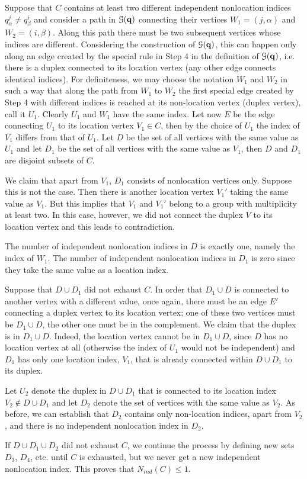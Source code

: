 \documentclass[draft]{article}
\newcommand{\bq}{{\bf {q}}}
\newcommand{\al}{\alpha}
\newcommand{\cG}{{\mathcal G}}
\newcommand{\qed}{\hfill\fbox{}\par\vspace{0.3mm}}
\newenvironment{proof}{{\bf Proof.}} {\hfill\qed}
\numberwithin{equation}{section}
\numberwithin{theorem}{section}
\numberwithin{definition}{section}
\numberwithin{remark}{section}
\begin{document}
\begin{proof}  Suppose that $C$ contains at least two
different independent nonlocation indices $q_\al^j\ne q_\beta^i$
and consider a path in $\cG(\bq)$
connecting their vertices $W_1=(j,\al)$ and $W_2=(i,\beta)$. 
Along this path there must be 
 two subsequent vertices whose indices are different. 
 Considering the
construction of $\cG(\bq)$, this can happen only
along an edge created by  the special rule in Step 4
in the definition of $\cG(\bq)$, i.e. there is a duplex
connected to its location vertex (any other edge connects
identical indices).  
For definiteness, we may choose the
notation $W_1$ and $W_2$ in such a way that along the
path from $W_1$ to $W_2$  the first special edge
created by Step 4 with different indices 
is reached at its non-location vertex
(duplex vertex), call it $U_1$. Clearly $U_1$ and $W_1$
have the same index.
Let now $E$ be the edge connecting    $U_1$ to its location vertex 
 $V_1 \in C$, then by the choice of $U_1$ the index of $V_1$ 
differs from that of $U_1$. 
Let $D$  be the set of all vertices with the same value as $U_1$
and let  $D_1$  be the set of all vertices with the same value as $V_1$,
then $D$ and $D_1$ are disjoint subsets of $C$.


We claim that apart from $V_1$, $D_1$ consists of  nonlocation vertices only.
 Suppose this is not the case. 
Then there is another location vertex $V_1'$ taking the same
 value as $V_1$.  But this implies that  $V_1$ and $V_1'$ 
belong to a group with multiplicity 
at least two. In this case, however, we did not connect the
 duplex $V$ to its location vertex and this leads to contradiction. 

The number of independent nonlocation indices in $D$ is exactly one,
namely the index of $W_1$.
The number of independent nonlocation indices in $D_1$ is zero
since they take  the same value as a location index.


Suppose that $D\cup D_1$ did not exhaust $C$.
In order that $D_1\cup D$ is connected to another vertex with 
a different value, once again, there must be an edge $E'$ connecting a duplex
 vertex to its location vertex; one of these two vertices
must be $D_1\cup D$, the other one must be in the complement.
We claim that the duplex is in $D_1\cup D$.
Indeed, the location vertex cannot be in $D_1\cup D$, 
since $D$ has no location vertex at all (otherwise the index of $U_1$ 
would not be independent) and $D_1$ has only  one location index, $V_1$,
that is already connected within $D\cup D_1$ to its duplex. 

Let  $U_2$ denote the duplex in  $D\cup D_1$ that is connected
to its location index $V_2\not\in D\cup D_1$ and let $D_2$ denote
the set of vertices  with the same value as $V_2$. As before, we
can establish that $D_2$ contains only non-location indices,
apart from $V_2$, and there is no independent nonlocation index in $D_2$.

If $D\cup D_1\cup D_2$ did not exhaust $C$, we continue the process
by defining new sets $D_3$, $D_4$, etc. until $C$ is
exhausted, but we never get a new independent nonlocation index.
This proves that $N_{ind}(C)\le1$.


\end{proof}
\end{document}
